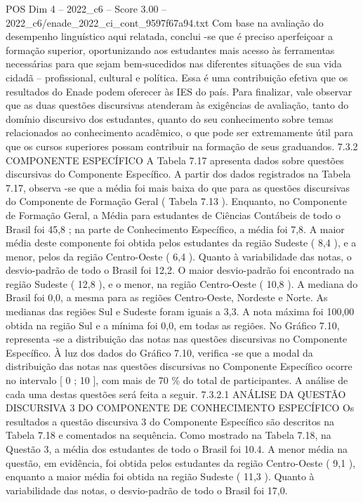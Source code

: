 \begin{textsample}{POS Dim 4 – 2022\_c6 – Score 3.00 – 2022\_c6/enade\_2022\_ci\_cont\_9597f67a94.txt}
Com base na avaliação do desempenho linguístico aqui relatada, conclui -se que é preciso aperfeiçoar a formação superior, oportunizando aos estudantes mais acesso às ferramentas necessárias para que sejam bem-sucedidos nas diferentes situações de sua vida cidadã – profissional, cultural e política.
Essa é uma contribuição efetiva que os resultados do Enade podem oferecer às IES do país.
Para finalizar, vale observar que as duas questões discursivas atenderam às exigências de avaliação, tanto do domínio discursivo dos estudantes, quanto do seu conhecimento sobre temas relacionados ao conhecimento acadêmico, o que pode ser extremamente útil para que os cursos superiores possam contribuir na formação de seus graduandos. 7.3.2 COMPONENTE ESPECÍFICO A Tabela 7.17 apresenta dados sobre questões discursivas do Componente Específico.
A partir dos dados registrados na Tabela 7.17, observa -se que a média foi mais baixa do que para as questões discursivas do Componente de Formação Geral ( Tabela 7.13 ).
Enquanto, no Componente de Formação Geral, a Média para estudantes de Ciências Contábeis de todo o Brasil foi 45,8 ; na parte de Conhecimento Específico, a média foi 7,8.
A maior média deste componente foi obtida pelos estudantes da região Sudeste ( 8,4 ), e a menor, pelos da região Centro-Oeste ( 6,4 ).
Quanto à variabilidade das notas, o desvio-padrão de todo o Brasil foi 12,2.
O maior desvio-padrão foi encontrado na região Sudeste ( 12,8 ), e o menor, na região Centro-Oeste ( 10,8 ).
A mediana do Brasil foi 0,0, a mesma para as regiões Centro-Oeste, Nordeste e Norte.
As medianas das regiões Sul e Sudeste foram iguais a 3,3.
A nota máxima foi 100,00 obtida na região Sul e a mínima foi 0,0, em todas as regiões.
No Gráfico 7.10, representa -se a distribuição das notas nas questões discursivas no Componente Específico.
À luz dos dados do Gráfico 7.10, verifica -se que a modal da distribuição das notas nas questões discursivas no Componente Específico ocorre no intervalo [ 0 ; 10 ], com mais de 70 \% do total de participantes.
A análise de cada uma destas questões será feita a seguir. 7.3.2.1 ANÁLISE DA QUESTÃO DISCURSIVA 3 DO COMPONENTE DE CONHECIMENTO ESPECÍFICO Os resultados a questão discursiva 3 do Componente Específico são descritos na Tabela 7.18 e comentados na sequência.
Como mostrado na Tabela 7.18, na Questão 3, a média dos estudantes de todo o Brasil foi 10.4.
A menor média na questão, em evidência, foi obtida pelos estudantes da região Centro-Oeste ( 9,1 ), enquanto a maior média foi obtida na região Sudeste ( 11,3 ).
Quanto à variabilidade das notas, o desvio-padrão de todo o Brasil foi 17,0.

\end{textsample}

